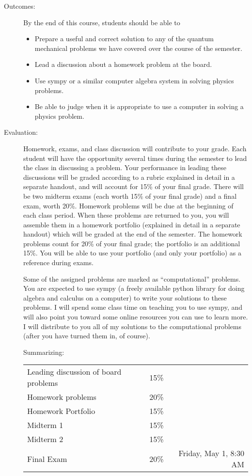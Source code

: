 \documentclass{article}
\begin{document}
\begin{description}
\item[Outcomes:] By the end of this course, students should be able to
  \begin{itemize}
  \item Prepare a useful and correct solution to any of the quantum
    mechanical problems we have covered over the course of the
    semester.
  \item Lead a discussion about a homework problem at the board.
  \item Use sympy or a similar computer algebra system in solving
    physics problems.
  \item Be able to judge when it is appropriate to use a computer in
    solving a physics problem.
\end{itemize}
\item[Evaluation:] Homework, exams, and class discussion will
  contribute to your grade.  Each student will have the opportunity
  several times during the semester to lead the class in discussing a
  problem.  Your performance in leading these discussions will be
  graded according to a rubric explained in detail in a separate
  handout, and will account for 15\% of your final grade. There will
  be two midterm exams (each worth 15\% of your final grade) and a
  final exam, worth 20\%.  Homework problems will be due at the
  beginning of each class period.  When these problems are returned to
  you, you will assemble them in a homework portfolio (explained in
  detail in a separate handout) which will be graded at the end of the
  semester.  The homework problems count for 20\% of your final grade;
  the portfolio is an additional 15\%.  You will be able to use your
  portfolio (and only your portfolio) as a reference during exams.

  Some of the assigned problems are marked as ``computational''
  problems.  You are expected to use sympy (a freely available python library for doing algebra and calculus on a computer) to write
  your solutions to these problems.  I will spend some class time on
  teaching you to use sympy, and will also point you toward some
  online resources you can use to learn more. I will distribute to you
  all of my solutions to the computational problems (after you have
  turned them in, of course).

  Summarizing:
  \begin{tabular}{lcr}
    Leading discussion of board problems & 15\% &\\
    Homework problems & 20\% &\\
    Homework Portfolio & 15\% &\\
    Midterm 1& 15\% & \\
    Midterm 2& 15\% & \\
    Final Exam & 20\% & Friday, May 1, 8:30 AM\\
  \end{tabular}


\end{description}
\end{document}
